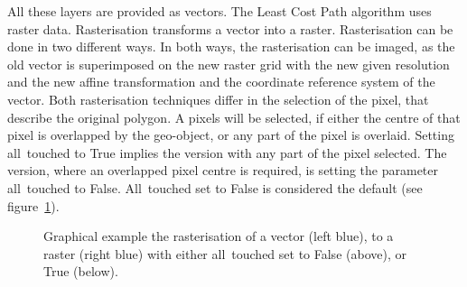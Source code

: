 All these layers are provided as vectors.
The Least Cost Path algorithm uses raster data.
Rasterisation transforms a vector into a raster.
Rasterisation can be done in two different ways.
In both ways, the rasterisation can be imaged, as the old vector is superimposed on the new raster grid with the new
given resolution and the new affine transformation and the coordinate reference system of the vector.
Both rasterisation techniques differ in the selection of the pixel, that describe the original polygon.
A pixels will be selected, if either the centre of that pixel is overlapped
by the geo-object, or any part of the pixel is overlaid.
Setting all~touched to True implies the version with any part of the pixel selected.
The version, where an overlapped pixel centre is required, is setting the parameter all~touched to False.
All~touched set to False is considered the default (see figure~\ref{fig:alltouched}).
\begin{figure}[!t]
	\centering

	\vspace*{5mm}
	\caption{Graphical example the rasterisation of a vector (left blue), to a raster (right blue) with either all~touched set to False (above), or True (below).}
	\label{fig:alltouched}

\end{figure}

